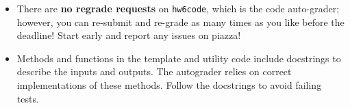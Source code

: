 \documentclass{article}
\theoremstyle{definition}
\theoremstyle{remark}
\begin{document}
\begin{itemize}
                    \item
                      There are \textbf{no regrade requests} on \texttt{hw6code}, which is the code auto-grader;
                      however, you can re-submit and re-grade as many times as you like before the deadline!
                      Start early and report any issues on piazza!

                    \item
                        Methods and functions in the template and utility code include
                        docstrings to describe the inputs and outputs.  The autograder
                        relies on correct implementations of these methods.  Follow the
                        docstrings to avoid failing tests.


                \end{itemize}
\end{document}
